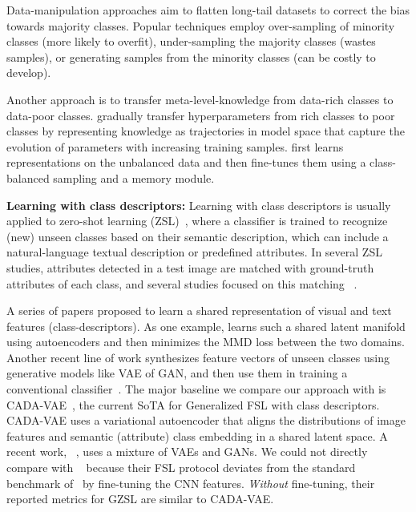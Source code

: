\documentclass[10pt,twocolumn,letterpaper]{article}
\begin{document}
Data-manipulation approaches aim to flatten long-tail datasets to correct the bias towards majority classes. Popular techniques employ over-sampling of minority classes (more likely to overfit)\cite{Chawla2002SMOTESM,Han2005BorderlineSMOTEAN}, under-sampling the majority classes (wastes samples)\cite{Drummond2003C4}, or generating samples from the minority classes (can be costly to develop)\cite{Beery2019SyntheticEI}. 

Another approach is to transfer meta-level-knowledge from data-rich classes to data-poor classes.
\cite{Wang2017earningTM} gradually transfer hyperparameters from rich classes to poor classes by representing knowledge as trajectories in model space that capture the evolution of parameters with increasing training samples. \cite{openlongtailrecognition} first learns representations on the unbalanced data and then fine-tunes them using a class-balanced sampling and a memory module.

\noindent\textbf{Learning with class descriptors:}
Learning with class descriptors is usually applied to zero-shot learning (ZSL)~\cite{xianCVPR,DAP,LAGO}, where a classifier is trained to recognize (new) unseen classes based on their semantic description, which can include a natural-language textual description or predefined attributes. In several ZSL studies, attributes detected in a test image are matched with ground-truth attributes of each class, and several studies focused on this matching  ~\cite{DAP,LAGO,RelationNet,DEM,zhang_kernel,SYNC}. 


A series of papers proposed to learn a shared representation of visual and text features (class-descriptors). As one example, 
\cite{REVISE} learns such a shared latent manifold using autoencoders and then minimizes the MMD loss between the two domains. Another recent line of work synthesizes feature vectors of unseen classes using generative models like VAE of GAN, and then use them in training a conventional classifier~\cite{PambalaGenerativeMW,xian_2018,CCGAN,CVAE2,CVAE1,ZhuGAN,Schnfeld2019GeneralizedZL,Xian2019FVAEGAND2AF}.  
The major baseline we compare our approach with is CADA-VAE~\cite{Schnfeld2019GeneralizedZL}, the current SoTA for Generalized FSL with class descriptors. CADA-VAE uses a variational autoencoder that aligns the distributions of image features and semantic (attribute) class embedding in a  shared latent space.
A recent work, ~\cite{Xian2019FVAEGAND2AF}, uses a mixture of VAEs and GANs.  
We could not directly compare with ~\cite{Xian2019FVAEGAND2AF} because their FSL protocol deviates from the standard benchmark of~\cite{Schnfeld2019GeneralizedZL,xianCVPR} by fine-tuning the CNN features. \textit{Without} fine-tuning, their reported metrics for GZSL are similar to CADA-VAE.
\end{document}
